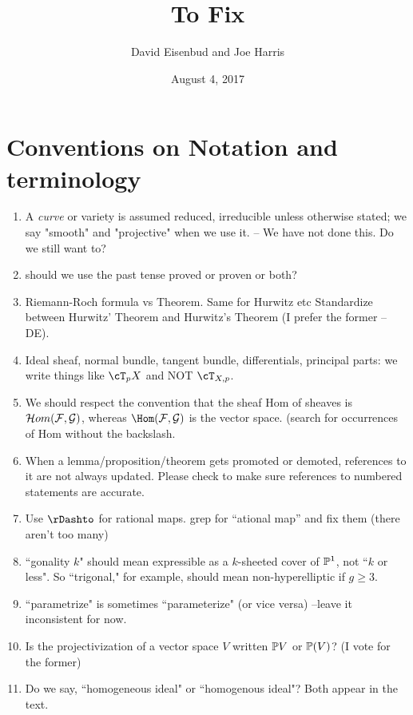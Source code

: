 \documentclass[12pt, leqno]{book}
\date{August 4, 2017}
\title{To Fix}
\author{David Eisenbud and Joe Harris }
\begin{document}
\maketitle

\setlength{\parskip}{5pt}

 
 \section{Conventions on Notation and terminology}
\begin{enumerate}

\item A \emph{curve} or variety is assumed  reduced, irreducible unless otherwise stated; we say "smooth" and "projective" when we use it. -- We have not done this. Do we still want to?

\item should we use the past tense proved or proven or both?

\item Riemann-Roch formula vs Theorem. Same for Hurwitz etc Standardize between Hurwitz' Theorem and Hurwitz's Theorem (I prefer the former -- DE).

\item Ideal sheaf, normal bundle, tangent bundle, differentials, principal parts: we write things like 
$\cT_{p}X$ and NOT $\cT_{X,p}$.  

\item We should respect the convention that the sheaf Hom of sheaves is
$\cH om(\cF,\cG)$, whereas $\Hom(\cF,\cG)$ is the vector space. (search for occurrences of Hom without the backslash.

\item When a lemma/proposition/theorem gets promoted or demoted, references to it are not always updated. Please check to make sure references to numbered statements are accurate. 

\item Use $\rDashto$ for rational maps. grep for ``ational map'' and fix them (there aren't too many) 

\item ``gonality $k$" should mean expressible as a $k$-sheeted cover of $\PP^1$, not ``$k$ or less". So ``trigonal," for example, should mean non-hyperelliptic if $g \geq 3$.

\item ``parametrize" is sometimes ``parameterize" (or vice versa) --leave it inconsistent for now.

\item Is the projectivization of a vector space $V$ written $\PP V$ or $\PP(V)$? (I vote for the former)

\item Do we say, ``homogeneous ideal" or ``homogenous ideal"? Both appear in the text.

\end{enumerate}
\end{document}
